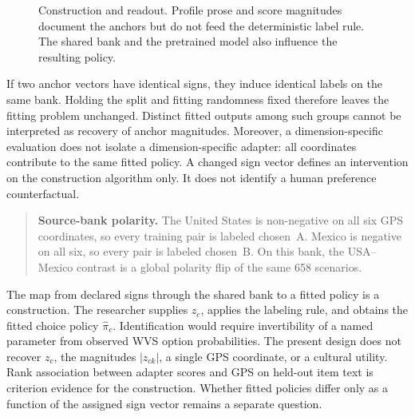 \begin{figure}[htbp]
\centering
{}
\caption{Construction and readout. Profile prose and score magnitudes document the anchors but do not feed the deterministic label rule. The shared bank and the pretrained model also influence the resulting policy.}\label{fig:pipeline}
\end{figure}

If two anchor vectors have identical signs, they induce identical labels on the same bank. Holding the split and fitting randomness fixed therefore leaves the fitting problem unchanged. Distinct fitted outputs among such groups cannot be interpreted as recovery of anchor magnitudes. Moreover, a dimension-specific evaluation does not isolate a dimension-specific adapter: all coordinates contribute to the same fitted policy. A changed sign vector defines an intervention on the construction algorithm only. It does not identify a human preference counterfactual.

\begin{quote}\small
\textbf{Source-bank polarity.} The United States is non-negative on all six GPS coordinates, so every training pair is labeled chosen~A. Mexico is negative on all six, so every pair is labeled chosen~B. On this bank, the USA--Mexico contrast is a global polarity flip of the same 658 scenarios.
\end{quote}

The map from declared signs through the shared bank to a fitted policy is a construction. The researcher supplies $z_c$, applies the labeling rule, and obtains the fitted choice policy $\widehat\pi_c$. Identification would require invertibility of a named parameter from observed WVS option probabilities. The present design does not recover $z_c$, the magnitudes $|z_{ck}|$, a single GPS coordinate, or a cultural utility. Rank association between adapter scores and GPS on held-out item text is criterion evidence for the construction. Whether fitted policies differ only as a function of the assigned sign vector remains a separate question.

